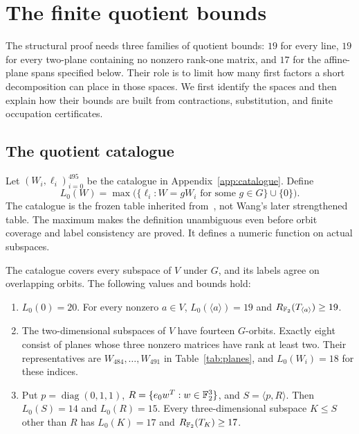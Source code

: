 \section{The finite quotient bounds}\label{sec:finite}

The structural proof needs three families of quotient bounds: $19$
for every line, $19$ for every two-plane containing no nonzero rank-one
matrix, and $17$ for the affine-plane spans specified below. Their
role is to limit how many first factors a short decomposition can
place in those spaces. We first identify the spaces and then explain
how their bounds are built from contractions, substitution, and
finite occupation certificates.

\subsection{The quotient catalogue}
Let $(W_i,\ell_i)_{i=0}^{495}$ be the catalogue in
Appendix~\ref{app:catalogue}. Define
\begin{equation}\label{eq:L0}
 L_0(W)=\max\bigl(\{\ell_i:W=gW_i\text{ for some }g\in G\}
                    \cup\{0\}\bigr).
\end{equation}
The catalogue is the frozen table inherited from~\cite{wang20}, not
Wang's later strengthened table. The maximum makes the definition
unambiguous even before orbit coverage and label consistency are proved.
It defines a numeric function on actual subspaces.

\begin{proposition}\label{prop:frozen}
The catalogue covers every subspace of $V$ under $G$, and its labels
agree on overlapping orbits. The following values and bounds hold:
\begin{enumerate}
\item $L_0(0)=20$. For every nonzero $a\in V$,
$L_0(\langle a\rangle)=19$ and $R_{\mathbb F_2}(T_{\langle a\rangle})\geq19$.
\item The two-dimensional subspaces of $V$ have fourteen $G$-orbits.
Exactly eight consist of planes whose three nonzero matrices have
rank at least two. Their representatives are $W_{484},\ldots,W_{491}$
in Table~\ref{tab:planes}, and $L_0(W_i)=18$ for these indices.
\item Put $p=\operatorname{diag}(0,1,1)$,
$R=\{e_0w^T:w\in\mathbb F_2^3\}$, and $S=\langle p,R\rangle$.
Then $L_0(S)=14$ and $L_0(R)=15$. Every three-dimensional
subspace $K\leq S$ other than $R$ has $L_0(K)=17$ and
$R_{\mathbb F_2}(T_K)\geq17$.
\end{enumerate}
\end{proposition}

